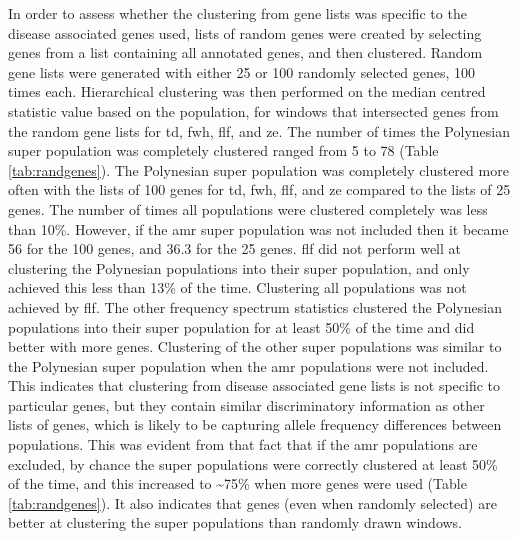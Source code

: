 \documentclass[twoside,openright]{report}
\begin{document}
In order to assess whether the clustering from gene lists was specific
to the disease associated genes used, lists of random genes were created
by selecting genes from a list containing all annotated genes, and then
clustered. Random gene lists were generated with either 25 or 100
randomly selected genes, 100 times each. Hierarchical clustering was
then performed on the median centred statistic value based on the
population, for windows that intersected genes from the random gene
lists for \gls{td}, \gls{fwh}, \gls{flf}, and \gls{ze}. The number of
times the Polynesian super population was completely clustered ranged
from 5 to 78 (Table \ref{tab:randgenes}). The Polynesian super
population was completely clustered more often with the lists of 100
genes for \gls{td}, \gls{fwh}, \gls{flf}, and \gls{ze} compared to the
lists of 25 genes. The number of times all populations were clustered
completely was less than 10\%. However, if the \gls{amr} super
population was not included then it became 56 for the 100 genes, and
36.3 for the 25 genes. \gls{flf} did not perform well at clustering the
Polynesian populations into their super population, and only achieved
this less than 13\% of the time. Clustering all populations was not
achieved by \gls{flf}. The other frequency spectrum statistics clustered
the Polynesian populations into their super population for at least 50\%
of the time and did better with more genes. Clustering of the other
super populations was similar to the Polynesian super population when
the \gls{amr} populations were not included. This indicates that
clustering from disease associated gene lists is not specific to
particular genes, but they contain similar discriminatory information as
other lists of genes, which is likely to be capturing allele frequency
differences between populations. This was evident from that fact that if
the \gls{amr} populations are excluded, by chance the super populations
were correctly clustered at least 50\% of the time, and this increased
to \textasciitilde{}75\% when more genes were used (Table
\ref{tab:randgenes}). It also indicates that genes (even when randomly
selected) are better at clustering the super populations than randomly
drawn windows.
\end{document}
